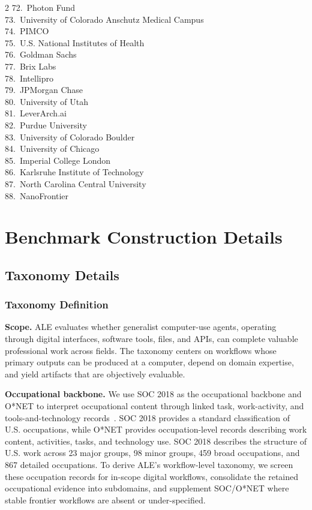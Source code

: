 \documentclass{llmxive}
\begin{document}
{\begin{multicols}{2}
72.~Photon Fund \\
73.~University of Colorado Anschutz Medical Campus \\
74.~PIMCO \\
75.~U.S. National Institutes of Health \\
76.~Goldman Sachs \\
77.~Brix Labs \\
78.~Intellipro \\
79.~JPMorgan Chase \\
80.~University of Utah \\
81.~LeverArch.ai \\
82.~Purdue University \\
83.~University of Colorado Boulder \\
84.~University of Chicago \\
85.~Imperial College London \\
86.~Karlsruhe Institute of Technology \\
87.~North Carolina Central University \\
88.~NanoFrontier
\end{multicols}}


\section{Benchmark Construction Details}
\label{app:benchmark-construction}

\subsection{Taxonomy Details}
\label{app:taxonomy}

\subsubsection{Taxonomy Definition}
\label{app:taxonomy-definition}

\noindent \textbf{Scope.}
ALE evaluates whether generalist computer-use agents, operating through digital interfaces, software
tools, files, and APIs, can complete valuable professional work across fields. The taxonomy centers
on workflows whose primary outputs can be produced at a computer, depend on domain expertise,
and yield artifacts that are objectively evaluable.

\noindent \textbf{Occupational backbone.}
We use SOC 2018 as the occupational backbone and O*NET to interpret occupational content through
linked task, work-activity, and tools-and-technology records~\citep{bls2018soc,peterson2001onet,onet302database}.
SOC 2018 provides a standard classification of U.S. occupations, while O*NET provides
occupation-level records describing work content, activities, tasks, and technology use. SOC 2018
describes the structure of U.S. work across 23 major groups, 98 minor groups, 459 broad occupations,
and 867 detailed occupations. To derive ALE's workflow-level taxonomy, we screen these occupation
records for in-scope digital workflows, consolidate the retained occupational evidence into
subdomains, and supplement SOC/O*NET where stable frontier workflows are absent or under-specified.
\end{document}
